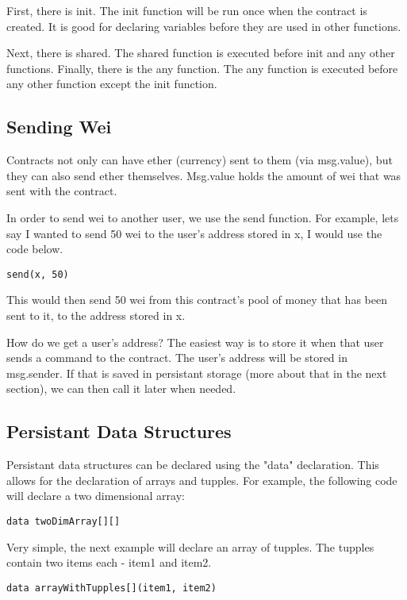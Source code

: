 \documentclass[12pt]{article}
\begin{document}
First, there is init. The init function will be run once when the contract is created. It is good for declaring variables before they are used in other functions.

Next, there is shared. The shared function is executed before init and any other functions. Finally, there is the any function. The any function is executed before any other function except the init function. \cite{Serpent}

\subsection{Sending Wei}
Contracts not only can have ether (currency) sent to them (via msg.value), but they can also send ether themselves. Msg.value holds the amount of wei that was sent with the contract.

In order to send wei to another user, we use the send function. For example, lets say I wanted to send 50 wei to the user's address stored in x, I would use the code below.

\begin{lstlisting}
send(x, 50)
\end{lstlisting}

This would then send 50 wei from this contract's pool of money that has been sent to it, to the address stored in x.

How do we get a user's address? The easiest way is to store it when that user sends a command to the contract. The user's address will be stored in msg.sender. If that is saved in persistant storage (more about that in the next section), we can then call it later when needed.

\subsection{Persistant Data Structures}

Persistant data structures can be declared using the "data" declaration. This allows for the declaration of arrays and tupples. For example, the following code will declare a two dimensional array:

\begin{lstlisting}
data twoDimArray[][]
\end{lstlisting}

Very simple, the next example will declare an array of tupples. The tupples contain two items each - item1 and item2.

\begin{lstlisting}
data arrayWithTupples[](item1, item2)
\end{lstlisting}
\end{document}

